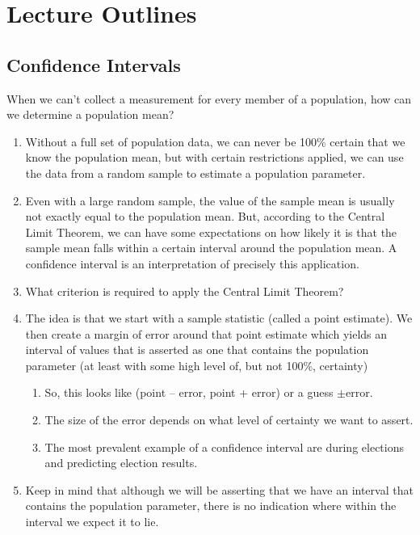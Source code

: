 \documentclass{ccg-topic}
\author{Joseph Timmer (Edited by Colton Grainger)}
\date{\today}
\begin{document}
\frontstuff

\setcounter{section}{-1}
\section{Lecture Outlines}
\subsection*{Confidence Intervals}

When we can't collect a measurement for every member of a population, how can we determine a population mean?

\begin{enumerate}

    \item Without a full set of population data, we can never be 100\% certain that we know the population mean, but with certain restrictions applied, we can use the data from a random sample to estimate a population parameter.

    \item Even with a large random sample, the value of the sample mean is usually not exactly equal to the population mean. But, according to the Central Limit Theorem, we can have some expectations on how likely it is that the sample mean falls within a certain interval around the population mean. A confidence interval is an interpretation of precisely this application.

    \item What criterion is required to apply the Central Limit Theorem?

    \item The idea is that we start with a sample statistic (called a point estimate). We then create a margin of error around that point estimate which yields an interval of values that is asserted as one that contains the population parameter (at least with some high level of, but not 100\%, certainty)
    
    \begin{enumerate}
    
        \item So, this looks like (point -- error, point + error) or a guess $\pm$error.
        
        \item The size of the error depends on what level of certainty we want to assert.
        
        \item The most prevalent example of a confidence interval are during elections and predicting election results.
        
    \end{enumerate}
    
    \item Keep in mind that although we will be asserting that we have an interval that contains the population parameter, there is no indication where within the interval we expect it to lie.
    
\end{enumerate}
\end{document}
